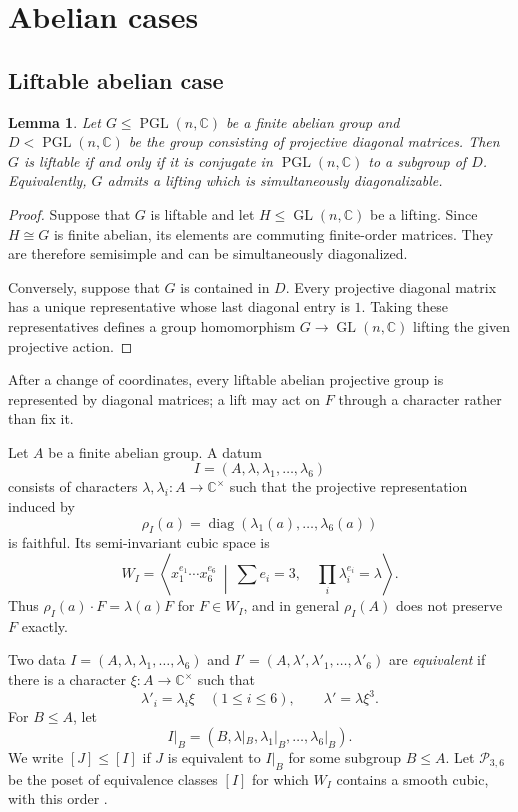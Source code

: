 \documentclass[12pt]{amsart}
\numberwithin{equation}{section}
\theoremstyle{plain}
\newtheorem{lem}[thm]{Lemma}
\theoremstyle{definition}
\theoremstyle{remark}
\newcommand{\CC}{\mathbb C}
\DeclareMathOperator{\GL}{GL}
\DeclareMathOperator{\PGL}{PGL}
\DeclareMathOperator{\diag}{diag}
\begin{document}
\section{Abelian cases}

\subsection{Liftable abelian case}
\label{subsec:liftable-abelian}

\begin{lem}\label{lem:abelian-liftable-diagonal}
Let $G\leq\PGL(n,\CC)$ be a finite abelian group and $D<\PGL(n,\CC)$ be the group consisting of projective diagonal matrices. Then $G$ is liftable if and
only if it is conjugate in $\PGL(n,\CC)$ to a subgroup of $D$.
Equivalently, $G$ admits a lifting which is simultaneously diagonalizable.
\end{lem}

\begin{proof}
Suppose that $G$ is liftable and let $H\leq\GL(n,\CC)$ be a
lifting.  Since $H\cong G$ is finite abelian, its elements are
commuting finite-order matrices.  They are therefore semisimple and can be
simultaneously diagonalized.

Conversely, suppose that $G$ is contained in $D$. Every projective diagonal matrix has a unique representative whose
last diagonal entry is $1$.  Taking these representatives defines a group
homomorphism $G\to\GL(n,\CC)$ lifting the given projective action.
\end{proof}

After a change of coordinates, every liftable abelian projective group is
represented by diagonal matrices; a lift may act on $F$ through a
character rather than fix it.

Let $A$ be a finite abelian group.  A datum
\[
I=(A,\lambda,\lambda_1,\ldots,\lambda_6)
\]
consists of characters $\lambda,\lambda_i:A\to\CC^\times$ such that the
projective representation induced by
\[
\rho_I(a)=\diag(\lambda_1(a),\ldots,\lambda_6(a))
\]
is faithful.  Its semi-invariant cubic space is
$$
W_I=\left\langle
x_1^{e_1}\cdots x_6^{e_6}\ \middle|\
\sum e_i=3,\quad \prod_i\lambda_i^{e_i}=\lambda
\right\rangle.
$$
Thus $\rho_I(a)\cdot F=\lambda(a)F$ for $F\in W_I$, and in general
$\rho_I(A)$ does not preserve $F$ exactly.

Two data $I=(A,\lambda,\lambda_1,\ldots,\lambda_6)$ and
$I'=(A,\lambda',\lambda'_1,\ldots,\lambda'_6)$ are \emph{equivalent} if
there is a character $\xi:A\to\CC^\times$ such that
\[
\lambda'_i=\lambda_i\xi\quad(1\leq i\leq6),
\qquad \lambda'=\lambda\xi^3.
\]
For $B\leq A$, let
\[
I|_B=(B,\lambda|_B,\lambda_1|_B,\ldots,\lambda_6|_B).
\]
We write $[J]\leq[I]$ if $J$ is equivalent to $I|_B$ for some subgroup
$B\leq A$.  Let $\mathcal P_{3,6}$ be the poset of equivalence classes
$[I]$ for which $W_I$ contains a smooth cubic, with this order
\cite[\S2.1]{zheng2021liftableabelian}.
\end{document}
